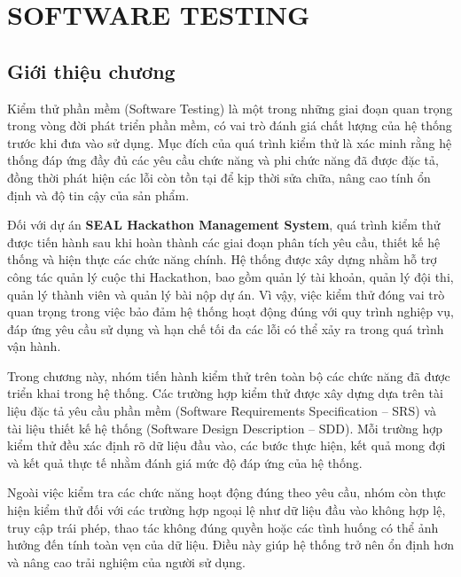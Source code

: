 ﻿%

\chapter{SOFTWARE TESTING}

\section{Giới thiệu chương}

Kiểm thử phần mềm (Software Testing) là một trong những giai đoạn quan trọng trong vòng đời phát triển phần mềm, có vai trò đánh giá chất lượng của hệ thống trước khi đưa vào sử dụng. Mục đích của quá trình kiểm thử là xác minh rằng hệ thống đáp ứng đầy đủ các yêu cầu chức năng và phi chức năng đã được đặc tả, đồng thời phát hiện các lỗi còn tồn tại để kịp thời sửa chữa, nâng cao tính ổn định và độ tin cậy của sản phẩm.

Đối với dự án \textbf{SEAL Hackathon Management System}, quá trình kiểm thử được tiến hành sau khi hoàn thành các giai đoạn phân tích yêu cầu, thiết kế hệ thống và hiện thực các chức năng chính. Hệ thống được xây dựng nhằm hỗ trợ công tác quản lý cuộc thi Hackathon, bao gồm quản lý tài khoản, quản lý đội thi, quản lý thành viên và quản lý bài nộp dự án. Vì vậy, việc kiểm thử đóng vai trò quan trọng trong việc bảo đảm hệ thống hoạt động đúng với quy trình nghiệp vụ, đáp ứng yêu cầu sử dụng và hạn chế tối đa các lỗi có thể xảy ra trong quá trình vận hành.

Trong chương này, nhóm tiến hành kiểm thử trên toàn bộ các chức năng đã được triển khai trong hệ thống. Các trường hợp kiểm thử được xây dựng dựa trên tài liệu đặc tả yêu cầu phần mềm (Software Requirements Specification – SRS) và tài liệu thiết kế hệ thống (Software Design Description – SDD). Mỗi trường hợp kiểm thử đều xác định rõ dữ liệu đầu vào, các bước thực hiện, kết quả mong đợi và kết quả thực tế nhằm đánh giá mức độ đáp ứng của hệ thống.

Ngoài việc kiểm tra các chức năng hoạt động đúng theo yêu cầu, nhóm còn thực hiện kiểm thử đối với các trường hợp ngoại lệ như dữ liệu đầu vào không hợp lệ, truy cập trái phép, thao tác không đúng quyền hoặc các tình huống có thể ảnh hưởng đến tính toàn vẹn của dữ liệu. Điều này giúp hệ thống trở nên ổn định hơn và nâng cao trải nghiệm của người sử dụng.


